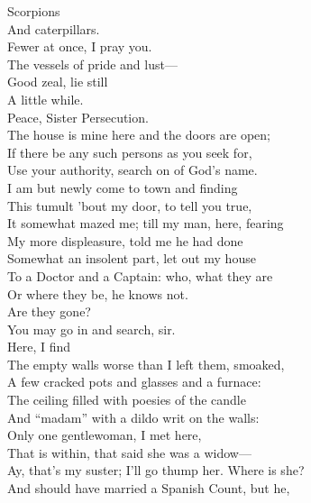 \documentclass[a4paper,oneside,12pt]{memoir}
\begin{document}
\begin{drama*}
\persecutionspeaks {} Scorpions\\
And caterpillars.\\
\lovewitspeaks {} Fewer at once, I pray you.\\
\persecutionspeaks The vessels of pride and lust---\\
\lovewitspeaks {} Good zeal, lie still\\
A little while.\\
\tribulationspeaks {} Peace, Sister Persecution.\\
\lovewitspeaks The house is mine here and the doors are open;\\
If there be any such persons as you seek for,\\
Use your authority, search on of God's name.\\
I am but newly come to town and finding\\
This tumult 'bout my door, to tell you true,\\
It somewhat mazed me; till my man, here, fearing\\
My more displeasure, told me he had done\\
Somewhat an insolent part, let out my house\\
To a Doctor and a Captain: who, what they are\\
Or where they be, he knows not.\\
\mammonspeaks {} Are they gone?\\
\lovewitspeaks You may go in and search, sir.\\
 Here, I find\\
The empty walls worse than I left them, smoaked,\\
A few cracked pots and glasses and a furnace:\\
The ceiling filled with poesies of the candle\\
And ``madam'' with a dildo writ on the walls:\\
Only one gentlewoman, I met here,\\
That is within, that said she was a widow---\\
\kastrilspeaks Ay, that's my suster; I'll go thump her. Where is she?\\
\lovewitspeaks And should have married a Spanish Count, but he,\\

\end{drama*}
\end{document}
